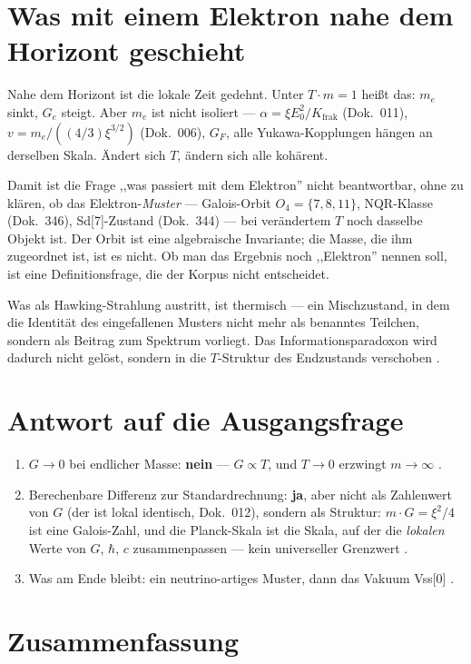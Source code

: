 \section{Was mit einem Elektron nahe dem Horizont geschieht \SM}

Nahe dem Horizont ist die lokale Zeit gedehnt. Unter $T\cdot m=1$ heißt
das: $m_e$ sinkt, $G_e$ steigt. Aber $m_e$ ist nicht isoliert ---
$\alpha=\xi E_0^2/K_\text{frak}$ (Dok.~011), $v=m_e/((4/3)\xi^{3/2})$
(Dok.~006), $G_F$, alle Yukawa-Kopplungen hängen an derselben Skala. Ändert
sich $T$, ändern sich alle kohärent.

Damit ist die Frage ,,was passiert mit dem Elektron'' nicht beantwortbar,
ohne zu klären, ob das Elektron-\emph{Muster} --- Galois-Orbit $O_4=\{7,8,11\}$,
NQR-Klasse (Dok.~346), Sd[7]-Zustand (Dok.~344)
--- bei verändertem $T$ noch
dasselbe Objekt ist. Der Orbit ist eine algebraische Invariante; die
Masse, die ihm zugeordnet ist, ist es nicht. Ob man das Ergebnis noch
,,Elektron'' nennen soll, ist eine Definitionsfrage, die der Korpus nicht
entscheidet.

Was als Hawking-Strahlung austritt, ist thermisch --- ein Mischzustand, in
dem die Identität des eingefallenen Musters nicht mehr als benanntes
Teilchen, sondern als Beitrag zum Spektrum vorliegt. Das
Informationsparadoxon wird dadurch nicht gelöst, sondern in die
$T$-Struktur des Endzustands verschoben \SM.

\section{Antwort auf die Ausgangsfrage}

\begin{enumerate}
\item $G\to0$ bei endlicher Masse: \textbf{nein} --- $G\propto T$, und
  $T\to0$ erzwingt $m\to\infty$ \BM.
\item Berechenbare Differenz zur Standardrechnung: \textbf{ja}, aber nicht
  als Zahlenwert von $G$ (der ist lokal identisch, Dok.~012), sondern als
  Struktur: $m\cdot G=\xi^2/4$ ist eine Galois-Zahl, und die Planck-Skala
  ist die Skala, auf der die \emph{lokalen} Werte von $G$, $\hbar$, $c$
  zusammenpassen --- kein universeller Grenzwert \SM.
\item Was am Ende bleibt: ein neutrino-artiges Muster, dann das Vakuum
  Vss[0] \SM.
\end{enumerate}

\section{Zusammenfassung}

